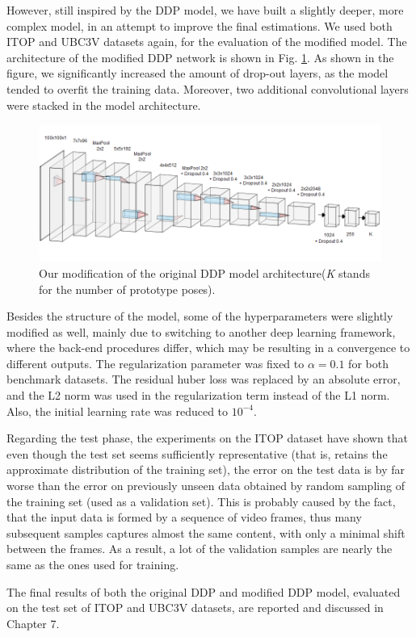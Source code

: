 \noindent
However, still inspired by the DDP model, we have built a slightly deeper, more complex model, in an attempt to improve the final estimations. We used both ITOP and UBC3V datasets again, for the evaluation of the modified model.
The architecture of the modified DDP network is shown in Fig. \ref{fig:mddp}. As shown in the figure, we significantly increased the amount of drop-out layers, as the model tended to overfit the training data. Moreover, two additional convolutional layers were stacked in the model architecture.\par
\vspace{5mm}

\begin{figure}[H]
\begin{center}
  \includegraphics[width=\textwidth]{images/implementation/mddp.png}
  \caption[Our modification of the original DDP model architecture.]{Our modification of the original DDP model architecture\break (\textit{K} stands for the number of prototype poses).}
  \label{fig:mddp}
\end{center}
\end{figure}


\noindent Besides the structure of the model, some of the hyperparameters were slightly modified as well, mainly due to switching to another deep learning framework, where the back-end procedures differ, which may be resulting in a convergence to different outputs. The regularization parameter was fixed to $\alpha = 0.1$ for both benchmark datasets. The residual huber loss was replaced by an absolute error, and the L2 norm was used in the regularization term instead of the L1 norm. Also, the initial learning rate was reduced to $10^{-4}$.\par
\vspace{5mm}
\noindent Regarding the test phase, the experiments on the ITOP dataset have shown that even though the test set seems sufficiently representative (that is, retains the approximate distribution of the training set), the error on the test data is by far worse than the error on previously unseen data obtained by random sampling of the training set (used as a validation set). This is probably caused by the fact, that the input data is formed by a sequence of video frames, thus many subsequent samples captures almost the same content, with only a minimal shift between the frames. As a result, a lot of the validation samples are nearly the same as the ones used for training.\par
\vspace{5mm}
\noindent
The final results of both the original DDP and modified DDP model, evaluated on the test set of ITOP and UBC3V datasets, are reported and discussed in Chapter 7.


